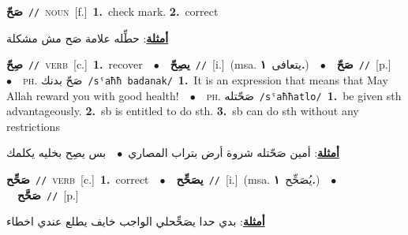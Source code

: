 \documentclass[10pt,a4paper,twoside]{article} %
\begin{document}
\begin{multicols}{2}
{{{{{{{{{{\setlength\topsep{0pt}\textbf{\foreignlanguage{arabic}{صَحّ}}\ {\color{gray}\texttt{//}\color{black}}\ \textsc{noun}\ [f.]\ \textbf{1.}~check mark.  \textbf{2.}~correct\  \begin{flushright}\color{gray}\foreignlanguage{arabic}{\textbf{\underline{\foreignlanguage{arabic}{أمثلة}}}: حطِّله علامة صَح مش مشكلة}\end{flushright}\color{black}} \vspace{2mm}

{\setlength\topsep{0pt}\textbf{\foreignlanguage{arabic}{صِحّ}}\ {\color{gray}\texttt{//}\color{black}}\ \textsc{verb}\ [c.]\ \textbf{1.}~recover\ \ $\bullet$\ \ \setlength\topsep{0pt}\textbf{\foreignlanguage{arabic}{يصِحّ}}\ {\color{gray}\texttt{//}\color{black}}\ [i.]\ \color{gray}(msa. \foreignlanguage{arabic}{يتعافى}~\foreignlanguage{arabic}{\textbf{١.}})\color{black}\ \ $\bullet$\ \ \setlength\topsep{0pt}\textbf{\foreignlanguage{arabic}{صَحّ}}\ {\color{gray}\texttt{//}\color{black}}\ [p.]\ \ $\bullet$\ \ \textsc{ph.} \color{gray} \foreignlanguage{arabic}{صَحّ بدنك}\color{black}\ {\color{gray}\texttt{/{\sffamily sˤaħħ badanak}/}\color{black}}\ \textbf{1.}~It is an expression that means that May Allah reward you with good health!\ \ $\bullet$\ \ \textsc{ph.} \color{gray} \foreignlanguage{arabic}{صَحّتله}\color{black}\ {\color{gray}\texttt{/{\sffamily sˤaħħatlo}/}\color{black}}\ \textbf{1.}~be given sth advantageously.  \textbf{2.}~sb is entitled to do sth.  \textbf{3.}~sb can do sth without any restrictions\  \begin{flushright}\color{gray}\foreignlanguage{arabic}{\textbf{\underline{\foreignlanguage{arabic}{أمثلة}}}: أمين صَحّتله شروة أرض بتراب المصاري\ $\bullet$\ \  بس يصِح بخليه يكلمك}\end{flushright}\color{black}} \vspace{2mm}

{\setlength\topsep{0pt}\textbf{\foreignlanguage{arabic}{صَحِّح}}\ {\color{gray}\texttt{//}\color{black}}\ \textsc{verb}\ [c.]\ \textbf{1.}~correct\ \ $\bullet$\ \ \setlength\topsep{0pt}\textbf{\foreignlanguage{arabic}{يصَحِّح}}\ {\color{gray}\texttt{//}\color{black}}\ [i.]\ \color{gray}(msa. \foreignlanguage{arabic}{يُصَحِّح}~\foreignlanguage{arabic}{\textbf{١.}})\color{black}\ \ $\bullet$\ \ \setlength\topsep{0pt}\textbf{\foreignlanguage{arabic}{صَحَّح}}\ {\color{gray}\texttt{//}\color{black}}\ [p.]\  \begin{flushright}\color{gray}\foreignlanguage{arabic}{\textbf{\underline{\foreignlanguage{arabic}{أمثلة}}}: بدي حدا يصَحِّحلي الواجب خايف يطلع عندي اخطاء}\end{flushright}\color{black}} \vspace{2mm}

}}}}}}}}}
\end{multicols}
\end{document}
